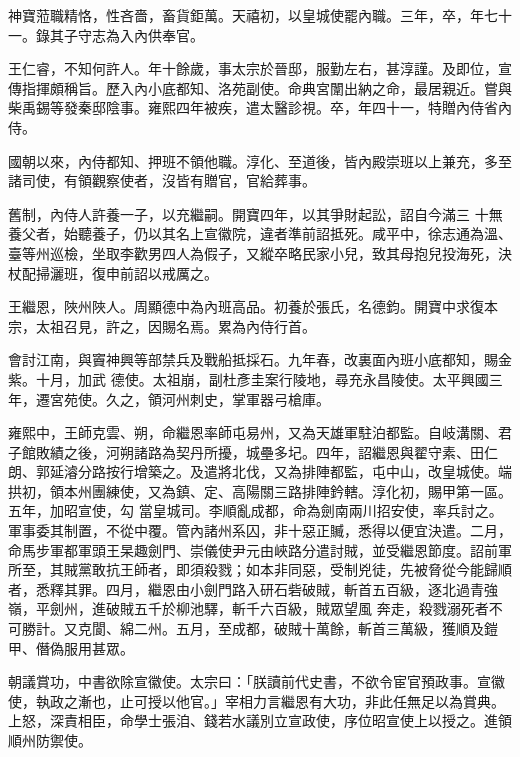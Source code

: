 \begin{pinyinscope}
 神寶蒞職精恪，性吝嗇，畜貨鉅萬。天禧初，以皇城使罷內職。三年，卒，年七十一。錄其子守志為入內供奉官。



 王仁睿，不知何許人。年十餘歲，事太宗於晉邸，服勤左右，甚淳謹。及即位，宣傳指揮頗稱旨。歷入內小底都知、洛苑副使。命典宮闈出納之命，最居親近。嘗與柴禹錫等發秦邸陰事。雍熙四年被疾，遣太醫診視。卒，年四十一，特贈內侍省內侍。



 國朝以來，內侍都知、押班不領他職。淳化、至道後，皆內殿崇班以上兼充，多至諸司使，有領觀察使者，沒皆有贈官，官給葬事。



 舊制，內侍人許養一子，以充繼嗣。開寶四年，以其爭財起訟，詔自今滿三
 十無養父者，始聽養子，仍以其名上宣徽院，違者準前詔抵死。咸平中，徐志通為溫、臺等州巡檢，坐取李歡男四人為假子，又縱卒略民家小兒，致其母抱兒投海死，決杖配掃灑班，復申前詔以戒厲之。



 王繼恩，陜州陜人。周顯德中為內班高品。初養於張氏，名德鈞。開寶中求復本宗，太祖召見，許之，因賜名焉。累為內侍行首。



 會討江南，與竇神興等部禁兵及戰船抵採石。九年春，改裏面內班小底都知，賜金紫。十月，加武
 德使。太祖崩，副杜彥圭案行陵地，尋充永昌陵使。太平興國三年，遷宮苑使。久之，領河州刺史，掌軍器弓槍庫。



 雍熙中，王師克雲、朔，命繼恩率師屯易州，又為天雄軍駐泊都監。自岐溝關、君子館敗績之後，河朔諸路為契丹所擾，城壘多圮。四年，詔繼恩與翟守素、田仁朗、郭延濬分路按行增築之。及遣將北伐，又為排陣都監，屯中山，改皇城使。端拱初，領本州團練使，又為鎮、定、高陽關三路排陣鈐轄。淳化初，賜甲第一區。五年，加昭宣使，勾
 當皇城司。李順亂成都，命為劍南兩川招安使，率兵討之。軍事委其制置，不從中覆。管內諸州系囚，非十惡正贓，悉得以便宜決遣。二月，命馬步軍都軍頭王杲趣劍門、崇儀使尹元由峽路分遣討賊，並受繼恩節度。詔前軍所至，其賊黨敢抗王師者，即須殺戮；如本非同惡，受制兇徒，先被脅從今能歸順者，悉釋其罪。四月，繼恩由小劍門路入研石砦破賊，斬首五百級，逐北過青強嶺，平劍州，進破賊五千於柳池驛，斬千六百級，賊眾望風
 奔走，殺戮溺死者不可勝計。又克閬、綿二州。五月，至成都，破賊十萬餘，斬首三萬級，獲順及鎧甲、僭偽服用甚眾。



 朝議賞功，中書欲除宣徽使。太宗曰：「朕讀前代史書，不欲令宦官預政事。宣徽使，執政之漸也，止可授以他官。」宰相力言繼恩有大功，非此任無足以為賞典。上怒，深責相臣，命學士張洎、錢若水議別立宣政使，序位昭宣使上以授之。進領順州防禦使。




\end{pinyinscope}
